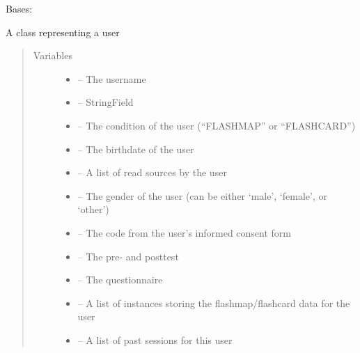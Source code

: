 \documentclass[letterpaper,10pt,english]{sphinxmanual}
\begin{document}
\begin{fulllineitems}
\label{\detokenize{user:user.User}}
Bases: 

A class representing a user
\begin{quote}\begin{description}
\item[{Variables}] \leavevmode\begin{itemize}
\item {} 
 -- The username

\item {} 
\href{https://docs.python.org/2/library/functions.html\#type}{} -- StringField

\item {} 
 -- The condition of the user (``FLASHMAP'' or ``FLASHCARD'')

\item {} 
 -- The birthdate of the user

\item {} 
 -- A list of read sources by the user

\item {} 
 -- The gender of the user (can be either `male', `female', or `other')

\item {} 
\href{https://docs.python.org/2/library/code.html\#module-code}{} -- The code from the user's informed consent form

\item {} 
 -- The pre- and posttest

\item {} 
{\hyperref[\detokenize{questionnaire:module-questionnaire}]{}} -- The questionnaire

\item {} 
 -- A list of instances storing the flashmap/flashcard data for the user

\item {} 
 -- A list of past sessions for this user


\end{itemize}
\end{description}
\end{quote}
\end{fulllineitems}
\end{document}
